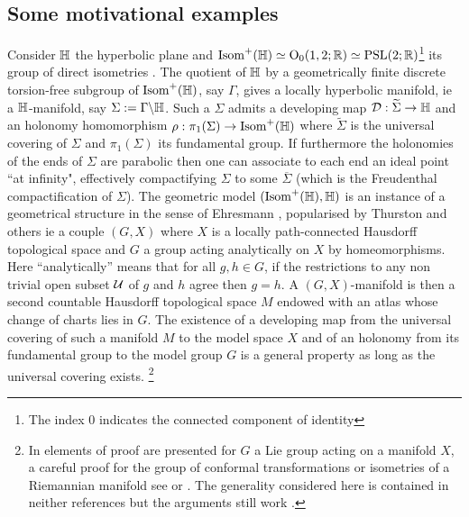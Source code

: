 \subsection{Some motivational examples}
Consider $\mathbb{H}$ the hyperbolic plane and $
\mathrm{Isom}^+(\mathbb{H})\simeq\mathrm{O}_{0}(1,2 ; \mathbb R)\simeq \mathrm{PSL}(2;\mathbb R)$\footnote{The index $0$ indicates the connected component of identity} its group of direct isometries . The quotient of $\mathbb{H}$ by a geometrically finite discrete torsion-free subgroup of $\mathrm{Isom}^+(\mathbb{H})$, say $\Gamma$, gives a locally hyperbolic manifold, ie  a $\mathbb{H}$-manifold, say $\Sigma:=\Gamma\backslash\mathbb{H}$. Such  a $\Sigma$ admits a developing map $\mathcal{D}:\widetilde \Sigma\rightarrow \mathbb{H}$ and an holonomy homomorphism
$\rho:\pi_1(\Sigma)\rightarrow \mathrm{Isom}^+(\mathbb{H})$ where $\widetilde \Sigma$ is the universal covering of $\Sigma$ and $\pi_1(\Sigma)$ its fundamental group. If furthermore the holonomies of the ends of $\Sigma$ are parabolic then one can associate to each end an ideal point ``at infinity", effectively compactifying $\Sigma$ to some $\overline \Sigma$ (which is the Freudenthal compactification \cite{MR931673} of $ \Sigma$). The geometric model $(\mathrm{Isom}^+(\mathbb{H}),\mathbb{H})$ is an instance of a geometrical structure in the sense of Ehresmann \cite{MR794193_loc_hom}, popularised by Thurston \cite{thurston-3mani} and others  \cite{MR957518,mess,MR2170277,barbot_globally_2004,MR2522946,MR1299730,MR755162} ie a couple $(G,X)$ 
where $X$ is a locally path-connected Hausdorff topological space and $G$ a group acting analytically on $X$ by homeomorphisms. Here ``analytically'' means that for all $g,h\in G$, if the restrictions to any non trivial open subset $\mathcal{U}$  of $g$ and $h$ agree then $g=h$. A $(G,X)$-manifold is then a second countable Hausdorff topological space $M$ endowed with an atlas whose change of charts lies in $G$. The existence of a developing map from the universal covering of such a manifold $M$ to the model space $X$ and of an holonomy from its fundamental group to the model group $G$ is a general property as long as the universal covering exists. \footnote{In \cite{MR794193_loc_hom} elements of proof are presented for $G$ a Lie group  acting on a manifold $X$, a careful proof for the group  of conformal transformations or isometries of a Riemannian  manifold see \cite{MR0031310} or \cite{MR755162}. The generality considered here is contained in neither references but the arguments still work \cite{thesis}.
}


